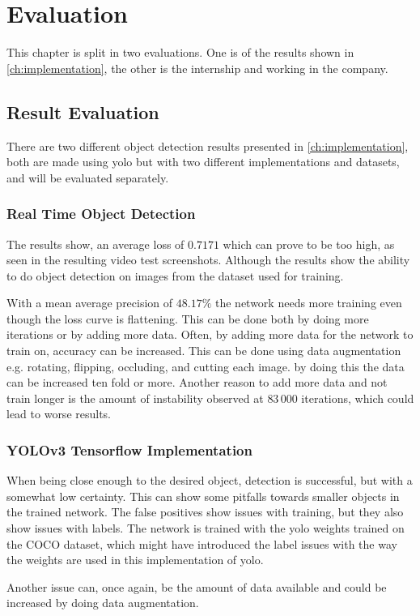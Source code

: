 \chapter{Evaluation}
This chapter is split in two evaluations. One is of the results shown in \autoref{ch:implementation}, the other is the internship and working in the company.
\section{Result Evaluation}
There are two different object detection results presented in \autoref{ch:implementation}, both are made using \gls{yolo} but with two different implementations and datasets, and will be evaluated separately.

\subsection{Real Time Object Detection}
The results show, an average loss of $ 0.7171 $ which can prove to be too high, as seen in the resulting video test screenshots. Although the results show the ability to do object detection on images from the dataset used for training.

With a mean average precision of $ 48.17\% $ the network needs more training even though the loss curve is flattening. This can be done both by doing more iterations or by adding more data. Often, by adding more data for the network to train on, accuracy can be increased. This can be done using data augmentation e.g. rotating, flipping, occluding, and cutting each image. by doing this the data can be increased ten fold or more. Another reason to add more data and not train longer is the amount of instability observed at $ 83\,000 $ iterations, which could lead to worse results.

\subsection{YOLOv3 Tensorflow Implementation}
When being close enough to the desired object, detection is successful, but with a somewhat low certainty. This can show some pitfalls towards smaller objects in the trained network. The false positives show issues with training, but they also show issues with labels. The network is trained with the \gls{yolo} weights trained on the COCO dataset, which might have introduced the label issues with the way the weights are used in this implementation of \gls{yolo}.

Another issue can, once again, be the amount of data available and could be increased by doing data augmentation.

